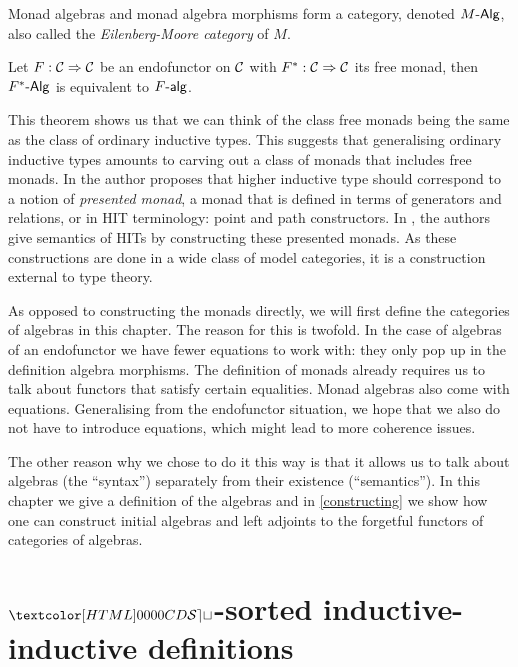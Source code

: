 Monad algebras and monad algebra morphisms form a category, denoted
$\monalgcat{M}$, also called the \emph{Eilenberg-Moore category} of
$M$.

\begin{theorem}
  Let $F : \mathcal{C} \Rightarrow \mathcal{C}$ be an endofunctor on $\mathcal{C}$ with
  $F^* : \mathcal{C} \Rightarrow \mathcal{C}$ its free monad, then $\monalgcat{F^*}$ is
  equivalent to $\algcat{F}$.
\end{theorem}

This theorem shows us that we can think of the class free monads being
the same as the class of ordinary inductive types. This suggests that
generalising ordinary inductive types amounts to carving out a class
of monads that includes free monads. In \cite{Shulman2011} the author
proposes that higher inductive type should correspond to a notion of
\emph{presented monad}, \ie a monad that is defined in terms of
generators and relations, or in HIT terminology: point and path
constructors. In \cite{Lumsdaine2013}, the authors give semantics of
HITs by constructing these presented monads. As these constructions
are done in a wide class of model categories, it is a construction
external to type theory.

As opposed to constructing the monads directly, we will first define
the categories of algebras in this chapter. The reason for this is
twofold. In the case of algebras of an endofunctor we have fewer
equations to work with: they only pop up in the definition algebra
morphisms. The definition of monads already requires us to talk about
functors that satisfy certain equalities. Monad algebras also come
with equations. Generalising from the endofunctor situation, we hope
that we also do not have to introduce equations, which might lead to
more coherence issues.

The other reason why we chose to do it this way is that it allows us
to talk about algebras (the ``syntax'') separately from their
existence (``semantics''). In this chapter we give a definition of the
algebras and in \cref{constructing} we show how one can construct
initial algebras and left adjoints to the forgetful functors of
categories of algebras.

\section{$\SET$-sorted inductive-inductive definitions}
\label{set-sorted-inductive-inductive-definitions}

